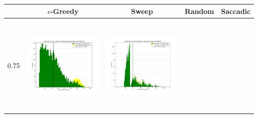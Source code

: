 \begin{landscape}
\begin{table}[h!]
  \centering
  \begin{tabular}{ | c | c | c | c | c |}
    \hline
    & $\epsilon$-Greedy & Sweep & Random & Saccadic \\
    \hline
    0.75 & 
    \begin{minipage}[c][48mm][c]{48mm}
      \includegraphics[width=48mm, height=48mm]{Chapters/MultiAgentTargetDetection/Figs/Histograms/VaryingInitBelief/75/75EpsilonGreedyHistogram.png}
    \end{minipage}
    &
    \begin{minipage}[c][48mm][c]{48mm}
      \includegraphics[width=48mm, height=48mm]{Chapters/MultiAgentTargetDetection/Figs/Histograms/VaryingInitBelief/75/75SweepHistogram.png}


\end{minipage}
\end{tabular}
\end{table}
\end{landscape}
